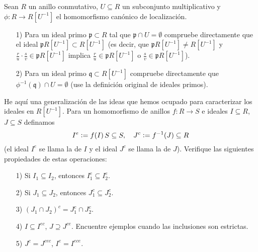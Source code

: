 \begin{ejercicio}
  Sean $R$ un anillo conmutativo, $U \subseteq R$ un subconjunto multiplicativo
  y $\phi\colon R \to R [U^{-1}]$ el homomorfismo canónico de localización.

  \begin{enumerate}
  \item[1)] Para un ideal primo $\mathfrak{p} \subset R$ tal que
    $\mathfrak{p} \cap U = \emptyset$ compruebe directamente que el ideal
    $\mathfrak{p} R [U^{-1}] \subset R [U^{-1}]$ (es decir, que
    $\mathfrak{p} R [U^{-1}] \ne R [U^{-1}]$ y
    $\frac{r}{u}\cdot\frac{s}{v} \in \mathfrak{p} R [U^{-1}]$ implica
    $\frac{r}{u} \in \mathfrak{p} R [U^{-1}]$ o
    $\frac{s}{v} \in \mathfrak{p} R [U^{-1}]$).

  \item[2)] Para un ideal primo $\mathfrak{q} \subset R [U^{-1}]$ compruebe
    directamente que $\phi^{-1} (\mathfrak{q}) \cap U = \emptyset$ (use
    la definición original de ideales primos).
  \end{enumerate}
\end{ejercicio}

\begin{ejercicio}
  He aquí una generalización de las ideas que hemos ocupado para caracterizar
  los ideales en $R [U^{-1}]$. Para un homomorfismo de anillos $f\colon R\to S$
  e ideales $I \subseteq R$, $J \subseteq S$ definamos
  $$I^e \mathrel{\mathop:}= f (I)\,S \subseteq S, \quad J^c \mathrel{\mathop:}= f^{-1} (J) \subseteq R$$
  (el ideal $I^e$ se llama la  de $I$ y el ideal $J^c$ se llama
  la  de $J$). Verifique las siguientes propiedades de estas
  operaciones:

  \begin{enumerate}
  \item[1)] Si $I_1 \subseteq I_2$, entonces $I_1^e \subseteq I_2^e$.

  \item[2)] Si $J_1 \subseteq J_2$, entonces $J_1^c \subseteq J_2^c$.

  \item[3)] $(J_1 \cap J_2)^c = J_1^c \cap J_2^c$.

  \item[4)] $I \subseteq I^{ec}$, $J \supseteq J^{ce}$. Encuentre ejemplos
    cuando las inclusiones son estrictas.

  \item[5)] $J^c = J^{cec}$, $I^e = I^{ece}$.
  \end{enumerate}
\end{ejercicio}

